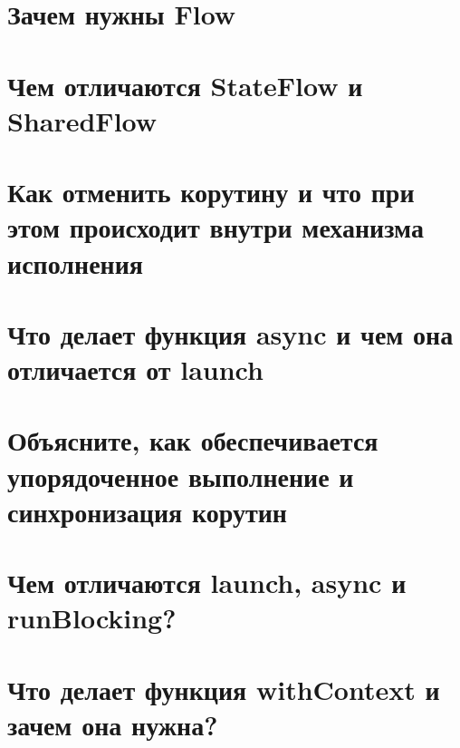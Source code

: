 \documentclass[12pt]{article}
\begin{document}
\section*{Зачем нужны Flow}
\begin{enumerate}[leftmargin=*]
\end{enumerate}
\vspace{2mm}
\section*{Чем отличаются StateFlow и SharedFlow}
\begin{enumerate}[leftmargin=*]
\end{enumerate}
\vspace{2mm}
\section*{Как отменить корутину и что при этом происходит внутри механизма исполнения}
\begin{enumerate}[leftmargin=*]
\end{enumerate}
\vspace{2mm}
\section*{Что делает функция async и чем она отличается от launch}
\begin{enumerate}[leftmargin=*]
\end{enumerate}
\vspace{2mm}
\section*{Объясните, как обеспечивается упорядоченное выполнение и синхронизация корутин}
\begin{enumerate}[leftmargin=*]
\end{enumerate}
\vspace{2mm}
\section*{Чем отличаются launch, async и runBlocking?}
\begin{enumerate}[leftmargin=*]
\end{enumerate}
\vspace{2mm}
\section*{Что делает функция withContext и зачем она нужна?}
\begin{enumerate}[leftmargin=*]
\end{enumerate}
\vspace{2mm}
\end{document}
